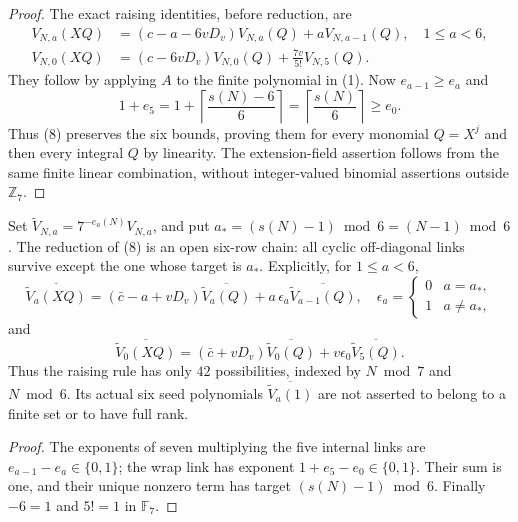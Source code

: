 \documentclass[11pt]{article}
\begin{document}
\begin{proof}
The exact raising identities, before reduction, are
\[
 \begin{split}
 V_{N,a}(XQ)&=(c-a-6vD_v)V_{N,a}(Q)+aV_{N,a-1}(Q),
                                  \quad 1\le a<6,\\
 V_{N,0}(XQ)&=(c-6vD_v)V_{N,0}(Q)
                         +\frac{7v}{5!}V_{N,5}(Q).
 \end{split}                                             \tag{8}
\]
They follow by applying $A$ to the finite polynomial in (1).
Now $e_{a-1}\ge e_a$ and
\[
 1+e_5=1+\left\lceil\frac{s(N)-6}{6}\right\rceil
       =\left\lceil\frac{s(N)}6\right\rceil\ge e_0 .
\]
Thus (8) preserves the six bounds, proving them for every
monomial $Q=X^j$ and then every integral $Q$ by linearity.
The extension-field assertion follows from the same finite
linear combination, without integer-valued binomial assertions
outside $\mathbb Z_7$.
\end{proof}

\begin{corollary}
\label{cor:cut}
Set $\widetilde V_{N,a}=7^{-e_a(N)}V_{N,a}$, and put
$a_*=(s(N)-1)\bmod6=(N-1)\bmod6$.
The reduction of (8) is an open six-row chain: all cyclic
off-diagonal links survive except the one whose target is $a_*$.
Explicitly, for $1\le a<6$,
\[
 \overline{\widetilde V_a(XQ)}
   =(\bar c-a+vD_v)\overline{\widetilde V_a(Q)}
       +a\,\epsilon_a\overline{\widetilde V_{a-1}(Q)},
 \quad
 \epsilon_a=\begin{cases}0&a=a_*,\\1&a\ne a_*,\end{cases}
 \tag{9}
\]
and
\[
 \overline{\widetilde V_0(XQ)}
 =(\bar c+vD_v)\overline{\widetilde V_0(Q)}
       +v\epsilon_0\overline{\widetilde V_5(Q)}.
 \tag{10}
\]
Thus the raising rule has only $42$ possibilities, indexed by
$N\bmod7$ and $N\bmod6$. Its actual six seed polynomials
$\overline{\widetilde V_a(1)}$ are not asserted to belong to a
finite set or to have full rank.
\end{corollary}
\begin{proof}
The exponents of seven multiplying the five internal links are
$e_{a-1}-e_a\in\{0,1\}$; the wrap link has exponent
$1+e_5-e_0\in\{0,1\}$. Their sum is one, and their unique
nonzero term has target $(s(N)-1)\bmod6$.
Finally $-6=1$ and $5!=1$ in $\mathbb F_7$.
\end{proof}
\end{document}
